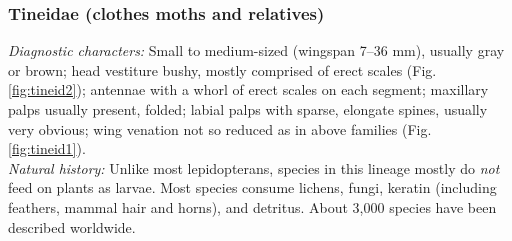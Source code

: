 \documentclass[letterpaper, 11pt]{article}
\begin{document}
\subsubsection{Tineidae (clothes moths and relatives)}
\noindent{}\textit{Diagnostic characters:} Small to medium-sized (wingspan 7--36 mm), usually gray or brown; head vestiture bushy, mostly comprised of erect scales (Fig. \ref{fig:tineid2}); antennae with a whorl of erect scales on each segment; maxillary palps usually present, folded; labial palps with sparse, elongate spines, usually very obvious; wing venation not so reduced as in above families (Fig. \ref{fig:tineid1}).\\

\noindent{}\textit{Natural history:} Unlike most lepidopterans, species in this lineage mostly do \textit{not} feed on plants as larvae. Most species consume lichens, fungi, keratin (including feathers, mammal hair and horns), and detritus. About 3,000 species have been described worldwide.
\end{document}

